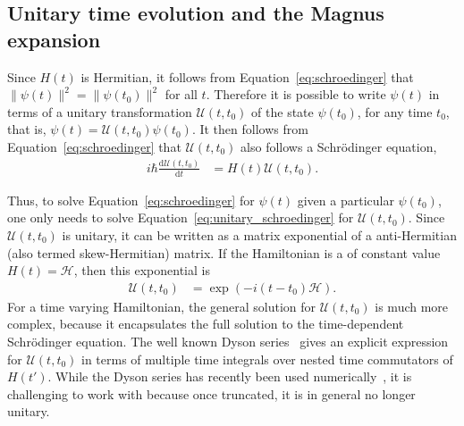 \documentclass{jors}
\newcommand{\note}[1]{\textcolor{green}{\texttt{[NOTE: #1]}}}
\begin{document}
	\subsection{Unitary time evolution and the Magnus expansion}\label{sec:magnus}
		Since $H(t)$ is Hermitian, it follows from Equation~\eqref{eq:schroedinger} that $\|\psi(t)\|^2 = \|\psi(t_0)\|^2$ for all $t$.
		Therefore it is possible to write $ \psi(t) $ in terms of a unitary transformation $ \mathcal{U}(t, t_0) $ of the state $ \psi(t_0) $, for any time $ t_0 $, that is, $ \psi(t) = \mathcal{U}(t, t_0)\psi(t_0) $.
		It then follows from Equation~\eqref{eq:schroedinger} that $ \mathcal{U}(t, t_0) $ also follows a Schr\"{o}dinger equation,
		\begin{align}
			i\hbar\frac{\mathrm{d}\mathcal{U}(t, t_0)}{\mathrm{d}t} &= H(t)\mathcal{U}(t, t_0).\label{eq:unitary_schroedinger}
		\end{align}

		Thus, to solve Equation~\eqref{eq:schroedinger} for $ \psi(t) $ given a particular $ \psi(t_0) $, one only needs to solve Equation~\eqref{eq:unitary_schroedinger} for $ \mathcal{U}(t, t_0) $.
		Since $ \mathcal{U}(t, t_0) $ is unitary, it can be written as a matrix exponential of a anti-Hermitian (also termed skew-Hermitian) matrix.
		If the Hamiltonian is a of constant value $ H(t) = \mathcal{H} $, then this exponential is %
		\begin{align}
			\mathcal{U}(t, t_0) &= \exp(-i (t - t_0) \mathcal{H}).\label{eq:exp_sol_of_constant}
		\end{align}
		For a time varying Hamiltonian, the general solution for $ \mathcal{U}(t, t_0) $ is much more complex, because it encapsulates the full solution to the time-dependent Schr\"{o}dinger equation.
		The well known Dyson series~\cite{kalev_integral-free_2020} gives an explicit expression for $ \mathcal{U}(t, t_0) $ in terms of multiple time integrals over nested time commutators of $ H(t') $.
		While the Dyson series has recently been used numerically~\cite{kalev_integral-free_2020}, it is challenging to work with because once truncated, it is in general no longer unitary.
\end{document}
